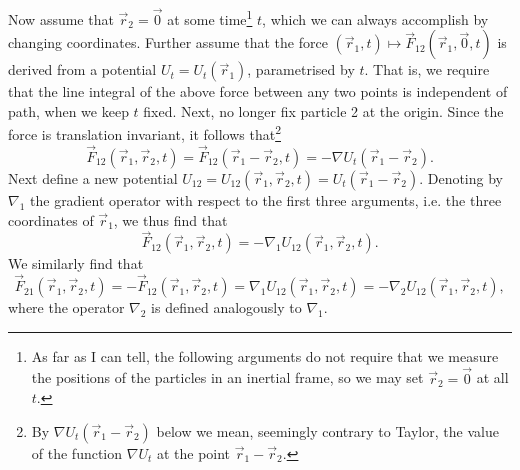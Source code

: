 \documentclass[article, a4paper, 11pt, oneside]{memoir}
\numberwithin{equation}{chapter}
\newcommand{\grad}{\nabla}
\begin{document}
Now assume that $\vec{r}_2 = \vec{0}$ at some time\footnote{As far as I can tell, the following arguments do not require that we measure the positions of the particles in an inertial frame, so we may set $\vec{r}_2 = \vec{0}$ at all $t$.} $t$, which we can always accomplish by changing coordinates. Further assume that the force $(\vec{r}_1, t) \mapsto \vec{F}_{12}(\vec{r}_1, \vec{0}, t)$ is derived from a potential $U_t = U_t(\vec{r}_1)$, parametrised by $t$. That is, we require that the line integral of the above force between any two points is independent of path, when we keep $t$ fixed. Next, no longer fix particle 2 at the origin. Since the force is translation invariant, it follows that\footnote{By $\grad U_t(\vec{r}_1 - \vec{r}_2)$ below we mean, seemingly contrary to Taylor, the value of the function $\grad U_t$ at the point $\vec{r}_1 - \vec{r}_2$.}
%
\begin{equation*}
    \vec{F}_{12}(\vec{r}_1, \vec{r}_2, t)
        = \vec{F}_{12}(\vec{r}_1 - \vec{r}_2, t)
        = -\grad U_t(\vec{r}_1 - \vec{r}_2).
\end{equation*}
%
Next define a new potential $U_{12} = U_{12}(\vec{r}_1, \vec{r}_{2}, t) = U_t(\vec{r}_1 - \vec{r}_2)$. Denoting by $\grad_1$ the gradient operator with respect to the first three arguments, i.e. the three coordinates of $\vec{r}_1$, we thus find that
%
\begin{equation*}
    \vec{F}_{12}(\vec{r}_1, \vec{r}_2, t)
        = -\grad_1 U_{12}(\vec{r}_1, \vec{r}_2, t).
\end{equation*}
%
We similarly find that
%
\begin{equation*}
    \vec{F}_{21}(\vec{r}_1, \vec{r}_2, t)
        = -\vec{F}_{12}(\vec{r}_1, \vec{r}_2, t)
        = \grad_1 U_{12}(\vec{r}_1, \vec{r}_2, t)
        = -\grad_2 U_{12}(\vec{r}_1, \vec{r}_2, t),
\end{equation*}
%
where the operator $\grad_2$ is defined analogously to $\grad_1$.
\end{document}

